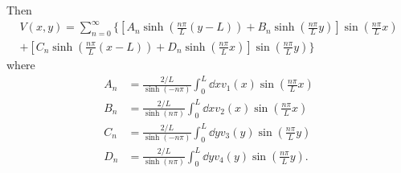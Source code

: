 \documentclass{report}
\begin{document}
  Then
  \begin{equation}
    \boxed{
    \begin{aligned}
      V(x,y) = \sum_{n=0}^\infty \Bigg\{\left[A_{n} \sinh(\frac{n\pi}{L} (y-L)) +
      B_{n} \sinh(\frac{n\pi}{L} y)\right] \sin(\frac{n\pi}{L}x)\\ +
      \left[C_{n} \sinh(\frac{n\pi}{L} (x - L)) +
      D_{n} \sinh(\frac{n\pi}{L} x) \right]\sin(\frac{n\pi}{L}y)  \Bigg\}
    \end{aligned}}
  \end{equation}
  where
  \begin{align}
    A_{n} &= \frac{2/L}{\sinh(-n\pi)}  \int_0^L \dd{x} v_1(x) \sin(\frac{n\pi}{L}x) \\
    B_{n} &= \frac{2/L}{\sinh(n\pi)}  \int_0^L \dd{x} v_2(x) \sin(\frac{n\pi}{L}x) \\
    C_{n} &= \frac{2/L}{\sinh(-n\pi)}  \int_0^L \dd{y} v_3(y) \sin(\frac{n\pi}{L}y) \\
    D_{n} &= \frac{2/L}{\sinh(n\pi)}  \int_0^L \dd{y} v_4(y) \sin(\frac{n\pi}{L}y).
  \end{align}
\end{document}
